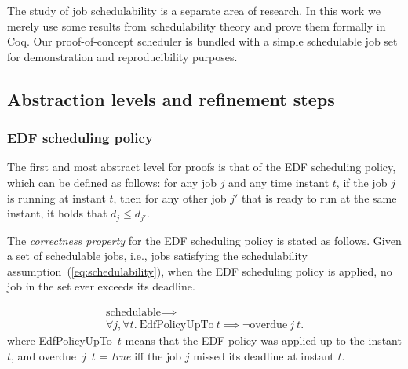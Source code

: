 	The study of job schedulability is a separate area of research.
	In this work we merely use some results from schedulability theory and prove them formally in Coq.
	Our proof-of-concept scheduler is bundled with a simple schedulable job set for demonstration and reproducibility purposes.


	\subsection{Abstraction levels and refinement steps}

	\subsubsection{EDF scheduling policy}
	\label{sec:policy}
	The first and most abstract level for proofs is that of the EDF
	scheduling policy, which can be defined as follows: for any job $j$ and any time instant $t$, if the job $j$ is running at instant $t$,
	then for any other job $j'$ that is ready to run at the same instant, it holds that $d_j \leq d_{j'}$.

	The \emph{correctness property} for the EDF scheduling policy is stated as follows.
	Given a set of schedulable jobs, i.e., jobs satisfying the schedulability assumption~(\ref{eq:schedulability}), when the EDF scheduling policy is applied,
	no job in the set ever exceeds its deadline.
	
	\begin{gather*}
  		\text{schedulable} \implies\\
  		\forall j, \forall t. ~\text{EdfPolicyUpTo}~t \implies \neg \text{overdue}~j~t.
	\end{gather*}
	where {EdfPolicyUpTo}~$t$ means that the EDF policy was  applied up to the instant $t$, and
	{overdue}~$j$~$t$ = \emph{true} iff the job $j$ missed its deadline at instant $t$.

